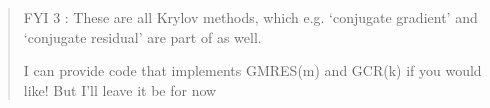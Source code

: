 \documentclass[12pt,british,round,comma,sort&compress]{article}
\begin{document}
\begin{itemize}
\begin{quote}
FYI 3 : These are all Krylov methods, which e.g. ‘conjugate gradient’ and ‘conjugate residual’ are part of as well.

I can provide code that implements GMRES(m) and GCR(k) if you would like! But I’ll leave it be for now
\end{quote}


\end{itemize}

\end{document}
